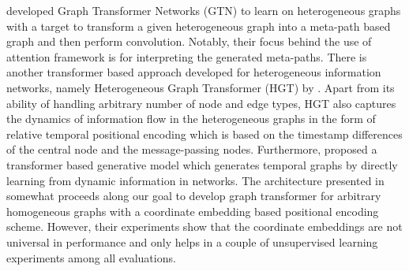 \documentclass[letterpaper]{article} %
\begin{document}
\citet{yun2019graph} developed Graph Transformer Networks (GTN) to learn on heterogeneous graphs with a target to transform a given heterogeneous graph into a meta-path based graph and then perform convolution. Notably, their focus behind the use of attention framework is for interpreting the generated meta-paths.
There is another transformer based approach developed for heterogeneous information networks, namely Heterogeneous Graph Transformer (HGT) by \citet{hu2020heterogeneous}. Apart from its ability of handling arbitrary number of node and edge types, HGT also captures the dynamics of information flow in the heterogeneous graphs in the form of relative temporal positional encoding which is based on the timestamp differences of the central node and the message-passing nodes. Furthermore, \citet{zhou2020data} proposed a transformer based generative model which generates temporal graphs by directly learning from dynamic information in networks.
The architecture presented in \citet{Nguyen2019U2GNN} somewhat proceeds along our goal to develop graph transformer for arbitrary homogeneous graphs with a coordinate embedding based positional encoding scheme. However, their experiments show that the coordinate embeddings are not universal in performance and only helps in a couple of unsupervised learning experiments among all evaluations. 
\end{document}
